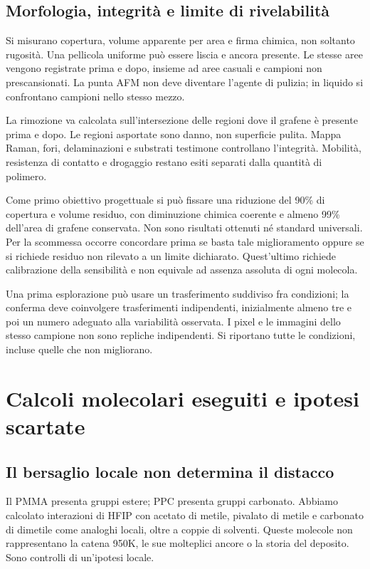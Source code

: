\documentclass[11pt,reqno]{amsart}
\numberwithin{equation}{section}
\begin{document}
\subsection{Morfologia, integrit\`a e limite di rivelabilit\`a}
Si misurano copertura, volume apparente per area e firma chimica,
non soltanto rugosit\`a. Una pellicola uniforme pu\`o essere
liscia e ancora presente. Le stesse aree vengono registrate
prima e dopo, insieme ad aree casuali e campioni non
prescansionati. La punta AFM non deve diventare l'agente di
pulizia; in liquido si confrontano campioni nello stesso mezzo.

La rimozione va calcolata sull'intersezione delle regioni dove
il grafene \`e presente prima e dopo. Le regioni asportate
sono danno, non superficie pulita. Mappa Raman, fori,
delaminazioni e substrati testimone controllano l'integrit\`a.
Mobilit\`a, resistenza di contatto e drogaggio restano esiti
separati dalla quantit\`a di polimero.

Come primo obiettivo progettuale si pu\`o fissare una riduzione
del 90\% di copertura e volume residuo, con diminuzione
chimica coerente e almeno 99\% dell'area di grafene conservata.
Non sono risultati ottenuti n\'e standard universali. Per la
scommessa occorre concordare prima se basta tale miglioramento
oppure se si richiede residuo non rilevato a un limite dichiarato.
Quest'ultimo richiede calibrazione della sensibilit\`a e non
equivale ad assenza assoluta di ogni molecola.

Una prima esplorazione pu\`o usare un trasferimento suddiviso
fra condizioni; la conferma deve coinvolgere trasferimenti
indipendenti, inizialmente almeno tre e poi un numero adeguato
alla variabilit\`a osservata. I pixel e le immagini dello
stesso campione non sono repliche indipendenti. Si riportano
tutte le condizioni, incluse quelle che non migliorano.


\section{Calcoli molecolari eseguiti e ipotesi scartate}\label{sec:molecular}

\subsection{Il bersaglio locale non determina il distacco}

Il PMMA presenta gruppi estere; PPC presenta gruppi carbonato. Abbiamo
calcolato interazioni di HFIP con acetato di metile, pivalato di metile
e carbonato di dimetile come analoghi locali, oltre a coppie di solventi.
Queste molecole non rappresentano la catena 950K, le sue molteplici
ancore o la storia del deposito. Sono controlli di un'ipotesi locale.
\end{document}
